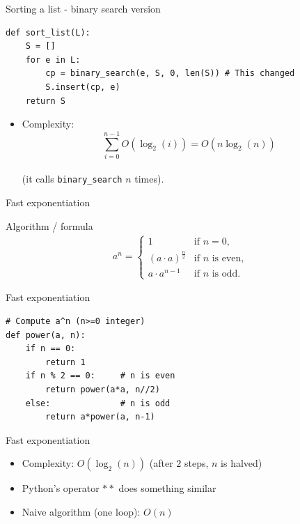 \documentclass[11pt]{beamer}
\begin{document}
\begin{frame}[fragile]{Sorting a list - binary search version}
\begin{lstlisting}
def sort_list(L):
	S = []
	for e in L:
		cp = binary_search(e, S, 0, len(S)) # This changed
		S.insert(cp, e)
	return S
\end{lstlisting}
	\vspace{0.3cm}
	\begin{itemize}
		\item Complexity: \[\sum_{i=0}^{n-1} O(\log_2(i)) = O(n\log_2(n))\]\\
			(it calls \texttt{binary\_search} $n$ times).
	\end{itemize}
\end{frame}

\begin{frame}{Fast exponentiation}
	\begin{block}{Algorithm / formula}
		\begin{align*}
			a^n=
			\begin{cases}
				1                     & \text{if }n=0,\\
				(a\cdot a)^{\frac n2} & \text{if $n$ is even},\\
				a\cdot a^{n-1}        & \text{if $n$ is odd.}
			\end{cases}
		\end{align*}
	\end{block}
\end{frame}

\begin{frame}[fragile]{Fast exponentiation}
\begin{lstlisting}
# Compute a^n (n>=0 integer)
def power(a, n):
	if n == 0:
		return 1
	if n % 2 == 0:     # n is even
		return power(a*a, n//2)
	else:              # n is odd
		return a*power(a, n-1)
\end{lstlisting}
\end{frame}

\begin{frame}{Fast exponentiation}
  
  \begin{itemize}
    \item Complexity: $O(\log_2(n))$ (after $2$ steps, $n$ is halved)
    \item Python's operator $**$ does something similar
    \item Naive algorithm (one loop): $O(n)$
  \end{itemize}
\end{frame}
\end{document}
